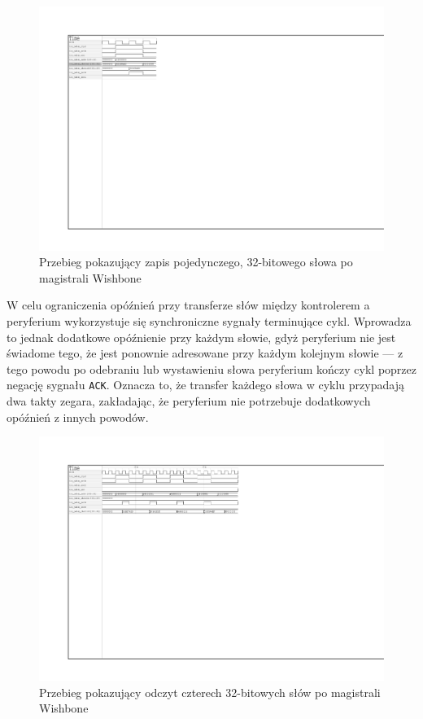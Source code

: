 \begin{figure}[H]
    \centering
    \includegraphics[scale=1.5,trim={2.54cm 14.73cm 19.6cm 2.9cm},clip]{implementation/classic-write.pdf}
    \caption{Przebieg pokazujący zapis pojedynczego, 32-bitowego słowa po magistrali Wishbone}
    \label{fig:wishbone-classic-write}
\end{figure}

W celu ograniczenia opóźnień przy transferze słów między kontrolerem a peryferium wykorzystuje się synchroniczne sygnały terminujące cykl. Wprowadza to jednak dodatkowe opóźnienie przy każdym słowie, gdyż peryferium nie jest świadome tego, że jest ponownie adresowane przy każdym kolejnym słowie --- z tego powodu po odebraniu lub wystawieniu słowa peryferium kończy cykl poprzez negację sygnału \texttt{ACK}. Oznacza to, że transfer każdego słowa w cyklu przypadają dwa takty zegara, zakładając, że peryferium nie potrzebuje dodatkowych opóźnień z innych powodów.

\begin{figure}[H]
    \centering
    \includegraphics[scale=1,trim={2.54cm 14.37cm 13cm 2.9cm},clip]{implementation/classic-read-4.pdf}
    \caption{Przebieg pokazujący odczyt czterech 32-bitowych słów po magistrali Wishbone}
    \label{fig:wishbone-classic-read-4}
\end{figure}


